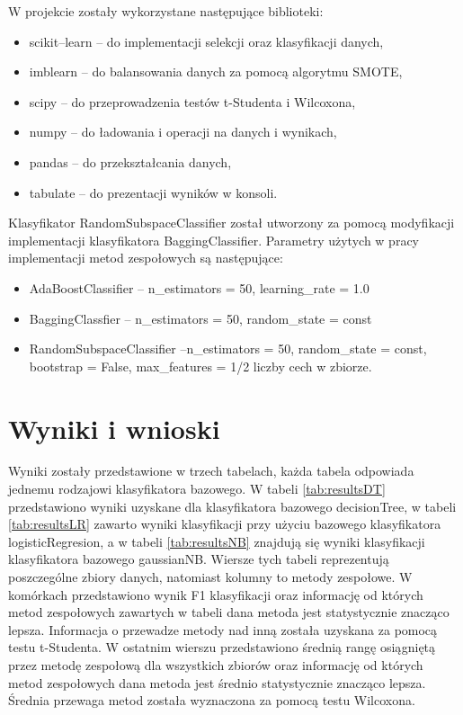 \documentclass[a4paper,12pt]{article}
\begin{document}
W projekcie zostały wykorzystane następujące biblioteki:
\begin{itemize}
    \item scikit--learn\cite{scikit} -- do implementacji selekcji oraz klasyfikacji danych,
    \item imblearn\cite{imblearn} -- do balansowania danych za pomocą algorytmu SMOTE,
    \item scipy\cite{scipy} -- do przeprowadzenia testów t-Studenta i Wilcoxona,
    \item numpy\cite{numpy} -- do ładowania i operacji na danych i wynikach,
    \item pandas\cite{pandas} -- do przekształcania danych,
    \item tabulate\cite{tabulate} -- do prezentacji wyników w konsoli.
\end{itemize}

Klasyfikator RandomSubspaceClassifier został utworzony za pomocą modyfikacji implementacji klasyfikatora BaggingClassifier.
Parametry użytych w pracy implementacji metod zespołowych są następujące:
\begin{itemize}
    \item AdaBoostClassifier -- n\_estimators = 50, learning\_rate = 1.0
    \item BaggingClassfier -- n\_estimators = 50, random\_state = const
    \item RandomSubspaceClassifier --n\_estimators = 50, random\_state = const,\\ bootstrap = False, max\_features = 1/2 liczby cech w zbiorze.
\end{itemize}

\newpage
\section{Wyniki i wnioski}
Wyniki zostały przedstawione w trzech tabelach, każda tabela odpowiada jednemu rodzajowi klasyfikatora bazowego. W tabeli \ref{tab:resultsDT} przedstawiono wyniki uzyskane dla klasyfikatora bazowego decisionTree, w tabeli \ref{tab:resultsLR} zawarto wyniki klasyfikacji przy użyciu bazowego klasyfikatora logisticRegresion, a w tabeli \ref{tab:resultsNB} znajdują się wyniki klasyfikacji klasyfikatora bazowego gaussianNB. Wiersze tych tabeli reprezentują poszczególne zbiory danych, natomiast kolumny to metody zespołowe. W komórkach przedstawiono wynik F1 klasyfikacji oraz informację od których metod zespołowych zawartych w tabeli dana metoda jest statystycznie znacząco lepsza. Informacja o przewadze metody nad inną została uzyskana za pomocą testu t-Studenta. W ostatnim wierszu przedstawiono średnią rangę osiągniętą przez metodę zespołową dla wszystkich zbiorów oraz informację od których metod zespołowych dana metoda jest średnio statystycznie znacząco lepsza. Średnia przewaga metod została wyznaczona za pomocą testu Wilcoxona.
\end{document}
